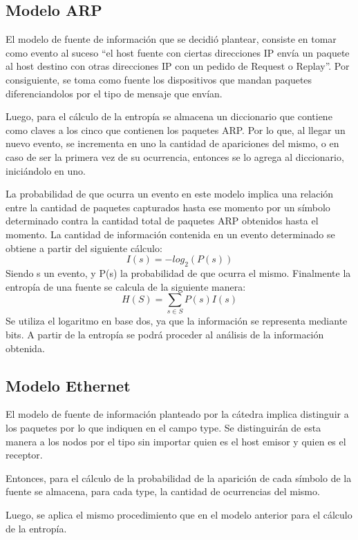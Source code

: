 \subsection{Modelo ARP}
El modelo de fuente de información que se decidió plantear, consiste en tomar como evento al suceso ``el host fuente con ciertas direcciones IP envía un paquete al host destino con otras direcciones IP con un pedido de Request o Replay''. Por consiguiente, se toma como fuente los dispositivos que mandan paquetes diferenciandolos por el tipo de mensaje que envían.

Luego, para el cálculo de la entropía se almacena un diccionario que contiene como claves a los cinco que contienen los paquetes ARP. Por lo que, al llegar un nuevo evento, se incrementa en uno la cantidad de apariciones del mismo, o en caso de ser la primera vez de su ocurrencia, entonces se lo agrega al diccionario, iniciándolo en uno.

La probabilidad de que ocurra un evento en este modelo implica una relación entre la cantidad de paquetes capturados hasta ese momento por un símbolo determinado contra la cantidad total de paquetes ARP obtenidos hasta el momento. 
La cantidad de información contenida en un evento determinado se obtiene a partir del siguiente cálculo: 
\begin{equation}
 I(s) = -log_{2}(P(s))
\end{equation}
Siendo s un evento, y P(s) la probabilidad de que ocurra el mismo. 
Finalmente la entropía de una fuente se calcula de la siguiente manera: 
\begin{equation}
 H(S) = \sum_{s \in S} P(s) I(s)
\end{equation}
Se utiliza el logaritmo en base dos, ya que la información se representa mediante bits. A partir de la entropía se podrá proceder al análisis de la información obtenida.

\subsection{Modelo Ethernet}
El modelo de fuente de información planteado por la cátedra implica distinguir a los paquetes por lo que indiquen en el campo type. Se distinguirán de esta manera a los nodos por el tipo sin importar quien es el host emisor y quien es el receptor. 

Entonces, para el cálculo de la probabilidad de la aparición de cada símbolo de la fuente se almacena, para cada type, la cantidad de ocurrencias del mismo.

Luego, se aplica el mismo procedimiento que en el modelo anterior para el cálculo de la entropía.